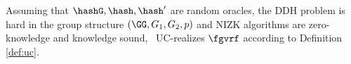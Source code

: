 

\begin{theorem}
	Assuming that $ \hashG, \hash,\hash' $ are random oracles,  the DDH problem is hard in the group structure $ (\GG, G_1,G_2, p) $ and NIZK algorithms are zero-knowledge and knowledge sound, \name \ UC-realizes $\fgvrf$ according to Definition \ref{def:uc}.
\end{theorem}

